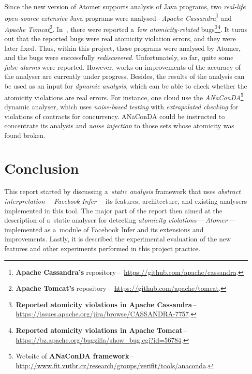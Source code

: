 Since the new version of Atomer supports analysis of Java programs, two
\emph{real-life open-source extensive} Java programs were
analysed\,--\,\emph{Apache
Cassandra}\footnote{\textbf{Apache Cassandra's} repository\,--\,%
\url{https://github.com/apache/cassandra}.} and \emph{Apache
Tomcat}\footnote{\textbf{Apache Tomcat's} repository\,--\,%
\url{https://github.com/apache/tomcat}.}. In~\cite{contracts2015,
contracts2017}, there were reported a~few \emph{atomicity-related}
bugs\footnote{\textbf{Reported atomicity violations in Apache Cassandra}\,--\,%
\url{https://issues.apache.org/jira/browse/CASSANDRA-7757}.}\footnote{\textbf{%
Reported atomicity violations in Apache Tomcat}\,--\,%
\url{https://bz.apache.org/bugzilla/show_bug.cgi?id=56784}.}. It turns out that
the reported bugs were real atomicity violation errors, and they were later
fixed. Thus, within this project, these programs were analysed by Atomer, and
the bugs were successfully \emph{rediscovered}. Unfortunately, so far, quite
some \emph{false alarms} were reported. However, works on improvements of the
accuracy of the analyser are currently under progress. Besides, the results
of the analysis can be used as an input for \emph{dynamic analysis}, which
can be able to check whether the atomicity violations are real errors. For
instance, one cloud use the \emph{ANaConDA}\footnote{Website of
\textbf{ANaConDA framework}\,--\,%
\url{http://www.fit.vutbr.cz/research/groups/verifit/tools/anaconda}.} dynamic
analyser, which uses \emph{noise-based testing} with \emph{extrapolated
checking} for violations of contracts for concurrency. ANaConDA could be
instructed to concentrate its analysis and \emph{noise injection} to those
sets whose atomicity was found broken.


\section{Conclusion}
\label{sec:conc}

This report started by discussing a~\emph{static analysis} \linebreak framework
that uses \emph{abstract interpretation}\,---\,\emph{Face\-book Infer}\,---\,its
features, architecture, and existing analysers implemented in this tool. The
major part of the report then aimed at the description of a~static analyser for
detecting \emph{atomicity
violations}\,---\,\emph{Atomer}\linebreak\,---\,implemented as a~module
of Facebook Infer and its extensions and improvements. Lastly, it is described
the experimental evaluation of the new features and other experiments performed
in this project practice.

